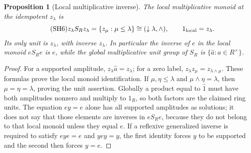 \documentclass[11pt]{article}
\newtheorem{proposition}[theorem]{Proposition}
\begin{document}
\begin{proposition}[Local multiplicative inverse]\label{sh:localmult}
The local multiplicative monoid at the idempotent $z_\lambda$ is
\begin{equation}\tag{SH6}\label{sh:localmonoid}
 z_\lambda S_Rz_\lambda
 =\{z_\mu:\mu\le\lambda\}\cong(\downarrow\lambda,\wedge),
 \qquad 1_{\rm local}=z_\lambda .
\end{equation}
Its only unit is $z_\lambda$, with inverse $z_\lambda$.
In particular the inverse of $e$ in the local monoid $eS_Re$
is $e$, while the global multiplicative unit group of $S_R$
is $\{\widehat a:a\in R^\times\}$.
\end{proposition}
\begin{proof}
For a supported amplitude, $z_\lambda\widehat a=z_\lambda$;
for a zero label, $z_\lambda z_\mu=z_{\lambda\wedge\mu}$.
These formulas prove the local monoid identification.  If
$\mu,\eta\le\lambda$ and $\mu\wedge\eta=\lambda$, then
$\mu=\eta=\lambda$, proving the unit assertion. Globally a product
equal to $\widehat1$ must have both amplitudes nonzero and multiply
to $1_R$, so both factors are the claimed ring units.
The equation $ey=e$ alone has all supported amplitudes as solutions;
it does not say that those elements are inverses in $eS_Re$,
because they do not belong to that local monoid unless they equal
$e$. If a reflexive generalized inverse is required to satisfy
$eye=e$ and $yey=y$, the first identity forces $y$ to be supported
and the second then forces $y=e$.
\end{proof}
\end{document}
